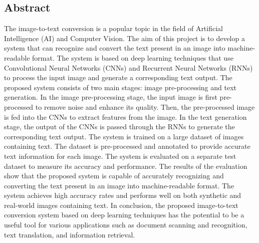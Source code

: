\begin{center}
    \section*{Abstract}
\end{center}
The image-to-text conversion is a popular topic in the field of Artificial Intelligence (AI) and Computer Vision. The aim of this project is to develop a system that can recognize and convert the text present in an image into machine-readable format. The system is based on deep learning techniques that use Convolutional Neural Networks (CNNs) and Recurrent Neural Networks (RNNs) to process the input image and generate a corresponding text output. The proposed system consists of two main stages: image pre-processing and text generation. In the image pre-processing stage, the input image is first pre-processed to remove noise and enhance its quality. Then, the pre-processed image is fed into the CNNs to extract features from the image. In the text generation stage, the output of the CNNs is passed through the RNNs to generate the corresponding text output. The system is trained on a large dataset of images containing text. The dataset is pre-processed and annotated to provide accurate text information for each image. The system is evaluated on a separate test dataset to measure its accuracy and performance. The results of the evaluation show that the proposed system is capable of accurately recognizing and converting the text present in an image into machine-readable format. The system achieves high accuracy rates and performs well on both synthetic and real-world images containing text. In conclusion, the proposed image-to-text conversion system based on deep learning techniques has the potential to be a useful tool for various applications such as document scanning and recognition, text translation, and information retrieval.

